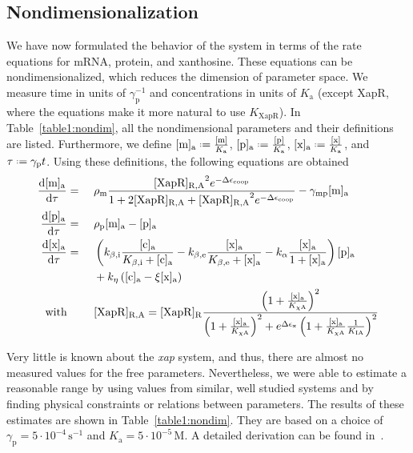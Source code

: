 \documentclass[10pt,letterpaper]{article}
\newcommand{\unit}[1]{\,\mathrm{#1}}
\newcommand{\n}[1]{\mathrm{#1}}
\newcommand{\dd}[2]{\frac{\mathrm{d} #1}{\mathrm{d} #2}}
\newcommand*{\defeq}{\mathrel{\vcenter{\baselineskip0.5ex \lineskiplimit0pt
			\hbox{\scriptsize.}\hbox{\scriptsize.}}}%
	=}
\begin{document}
\subsection*{Nondimensionalization}
We have now formulated the behavior of the system in terms of the rate
equations for mRNA, protein, and xanthosine. These equations can be
nondimensionalized, which reduces the dimension of parameter space. We
measure time in units of $\gamma_{\n{p}}^{-1}$ and concentrations in units
of $K_{\n{a}}$ (except XapR, where the equations make it more natural to use
$K_{\n{XapR}}$). In Table~\ref{table1:nondim}, all the nondimensional
parameters and their definitions are listed. Furthermore, we define
$\n{[m]_a} \defeq \frac{\n{[m]}}{K_{\n{a}}}$, $\n{[p]_a} \defeq
\frac{\n{[p]}}{K_{\n{a}}}$, $\n{[x]_a} \defeq \frac{\n{[x]}}{K_{\n{a}}}$,
and $\tau \defeq \gamma_{\n{p}} t$. Using these definitions, the following
equations are obtained
\begin{alignat}{2}
\dd{\mathrm{[m]_a}}{\tau} &= \ &&
\rho_{\n{m}} 
\frac{
	\mathrm{[XapR]_{R,A}}^2 
	e^{- \Delta \epsilon_{\text{coop}}}
}{
	1 + 
	2 \mathrm{[XapR]_{R,A}} +
	\mathrm{[XapR]_{R,A}}^2 e^{- \Delta \epsilon_{\text{coop}}}
}
- \gamma_{\n{mp}} \mathrm{[m]_a}
\\
\dd{\mathrm{[p]_a}}{\tau} &= \ &&
\rho_{\n{p}} \mathrm{[m]_a}
- \mathrm{[p]_a}
\\
\dd{\mathrm{[x]_a}}{\tau} &= \ && \left(k_{\n{\beta,i}} \frac{\n{[c]_a}}{K_{\n{\beta,i}} + \n{[c]_a}} - k_{\n{\beta,e}} \frac{\n{[x]_a}}{K_{\n{\beta,e}} + \n{[x]_a}} - k_{\n{\alpha}} \frac{\n{[x]_a}}{1 + \n{[x]_a}}\right) \mathrm{[p]_a} \\ & && + k_{\n{\eta}} \left(\mathrm{[c]_a} - \xi \mathrm{[x]_a}\right)
\nonumber \\
\text{with} & && \raggedleft [\n{XapR}]_{\mathrm{R,\n{A}}} = [\n{XapR}]_{\mathrm{R}} \frac{\left(1 + \frac{\mathrm{[x]_{\n{a}}}}{K_{\n{\chi A}}}\right)^2}{\left(1 + \frac{\mathrm{[x]_{\n{a}}}}{K_{\n{\chi A}}}\right)^2 + e^{\Delta \epsilon_{\n{x}}} \left(1+\frac{\mathrm{[x]_{\n{a}}}}{K_{\n{\chi A}}} \frac{1}{K_{\n{IA}}}\right)^2} \nonumber
\end{alignat}

Very little is known about the \emph{xap} system, and thus, there are almost no
measured values for the free parameters. Nevertheless, we were able to
estimate a reasonable range by using values from similar, well studied
systems and by finding physical constraints or relations between parameters.
The results of these estimates are shown in Table~\ref{table1:nondim}. They
are based on a choice of $\gamma_{\n{p}} = 5 \cdot 10^{-4} \unit{s^{-1}}$
and $K_{\n{a}} = 5 \cdot 10^{-5} \unit{M}$. A detailed derivation can be
found in~. 
\end{document}
